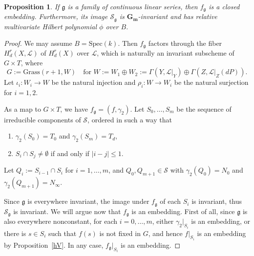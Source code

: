 \documentclass[a4paper,11pt]{amsart}
\theoremstyle{plain}
\newtheorem{prop}[thm]{Proposition}
\theoremstyle{definition}
\theoremstyle{remark}
\def\cc{{\mathbf G}_{\mathbf m}}
\def\L{\mathcal{L}}
\begin{document}
\begin{prop}\label{betaclass} If $\mathfrak g$ is a family of continuous linear series, then $f_{\mathfrak g}$ is a closed embedding. Furthermore, its image $\mathcal S_{\mathfrak g}$ is $\cc$-invariant and has relative multivariate Hilbert polynomial $\phi$ over $B$. 
\end{prop}

\begin{proof} We may assume $B=\text{Spec}(k)$. Then $f_{\mathfrak g}$ factors through the fiber $H^r_d(X,\L)$ of $H^r_d(X)$ over $\L$, which is naturally an invariant subscheme of $G\times T$, where \[
G:=\text{Grass}(r+1,W)\quad\text{for }
W:=W_1\oplus W_2:=\Gamma(Y,\L|_Y)\oplus\Gamma(Z,\L|_Z(dP)).
\]
Let $\iota_i\colon W_i\to W$ be the natural injection and $\rho_i\colon W\to W_i$ be the natural surjection for $i=1,2$.

As a map to $G\times T$, we have $f_{\mathfrak g}=(f,\gamma_2)$. 
Let $S_0,\dots,S_m$ be the sequence of irreducible components of $\mathcal S$, ordered in such a way that 
\begin{enumerate}
    \item $\gamma_2(S_0)=T_0$ and $\gamma_2(S_m)=T_d$,
    \item $S_i\cap S_j\neq\emptyset$ if and only if $|i-j|\leq 1$.
    \end{enumerate}
Let $Q_i:=S_{i-1}\cap S_i$ for $i=1,\dots,m$, and $Q_0,Q_{m+1}\in\mathcal S$ with $\gamma_2(Q_0)=N_0$ and $\gamma_2(Q_{m+1})=N_\infty$. 

Since $\mathfrak g$ is everywhere invariant, the image under $f_{\mathfrak g}$ of each $S_i$ is invariant, thus $\mathcal S_{\mathfrak g}$ is invariant. We will argue now that $f_{\mathfrak g}$ is an embedding. First of all, since $\mathfrak g$ is also everywhere nonconstant, for each $i=0,\dots,m$, either $\gamma_2|_{S_i}$ is an embedding, or there is $s\in S_i$ such that $f(s)$ is not fixed in $G$, and hence $f|_{S_i}$ is an embedding by Proposition~\ref{hV}. In any case, 
$f_{\mathfrak g}|_{S_i}$ is an embedding.


\end{proof}
\end{document}
